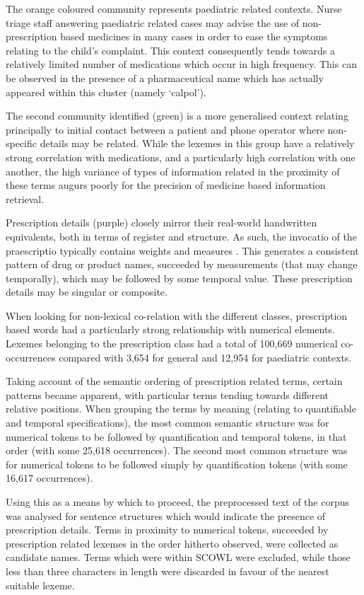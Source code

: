 The orange coloured community represents paediatric related contexts. Nurse triage staff answering paediatric related cases may advise the use of non-prescription based medicines in many cases in order to ease the symptoms relating to the child's complaint. This context consequently tends towards a relatively limited number of medications which occur in high frequency. This can be observed in the presence of a pharmaceutical name which has actually appeared within this cluster (namely `calpol').

The second community identified (green) is a more generalised context relating principally to initial contact between a patient and phone operator where non-specific details may be related. While the lexemes in this group have a relatively strong correlation with medications, and a particularly high correlation with one another, the high variance of types of information related in the proximity of these terms augurs poorly for the precision of medicine based information retrieval. 

Prescription details (purple) closely mirror their real-world handwritten equivalents, both in terms of register and structure. As such, the invocatio of the praescriptio typically contains weights and measures \cite{hadavsova2009practicals}. This generates a consistent pattern of drug or product names, succeeded by measurements (that may change temporally), which may be followed by some temporal value. These prescription details may be singular or composite.

When looking for non-lexical co-relation with the different classes, prescription based words had a particularly strong relationship with numerical elements. Lexemes belonging to the prescription class had a total of 100,669 numerical co-occurrences compared with 3,654 for general and 12,954 for paediatric contexts. 

Taking account of the semantic ordering of prescription related terms, certain patterns became apparent, with particular terms tending towards different relative positions. When grouping the terms by meaning (relating to quantifiable and temporal specifications), the most common semantic structure was for numerical tokens to be followed by quantification and temporal tokens, in that order (with some 25,618 occurrences). The second most common structure was for numerical tokens to be followed simply by quantification tokens (with some 16,617 occurrences).  

Using this as a means by which to proceed, the preprocessed text of the corpus was analysed for sentence structures which would indicate the presence of prescription details. Terms in proximity to numerical tokens, succeeded by prescription related lexemes in the order hitherto observed, were collected as candidate names. Terms which were within SCOWL  were excluded, while those less than three characters in length were discarded in favour of the nearest suitable lexeme. 



